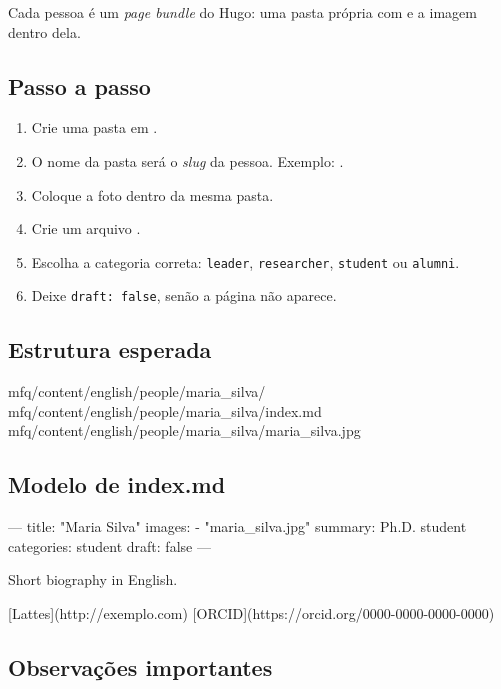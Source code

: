 \documentclass[11pt,a4paper]{article}
\begin{document}
Cada pessoa é um \emph{page bundle} do Hugo: uma pasta própria com  e a imagem dentro dela.

\subsection{Passo a passo}

\begin{enumerate}
  \item Crie uma pasta em .
  \item O nome da pasta será o \emph{slug} da pessoa. Exemplo: .
  \item Coloque a foto dentro da mesma pasta.
  \item Crie um arquivo .
  \item Escolha a categoria correta: \texttt{leader}, \texttt{researcher}, \texttt{student} ou \texttt{alumni}.
  \item Deixe \texttt{draft: false}, senão a página não aparece.
\end{enumerate}

\subsection{Estrutura esperada}

\begin{terminal}
mfq/content/english/people/maria_silva/
mfq/content/english/people/maria_silva/index.md
mfq/content/english/people/maria_silva/maria_silva.jpg
\end{terminal}

\subsection{Modelo de index.md}

\begin{terminal}
---
title: "Maria Silva"
images:
  - "maria_silva.jpg"
summary: Ph.D. student
categories: student
draft: false
---

Short biography in English.

[Lattes](http://exemplo.com)
[ORCID](https://orcid.org/0000-0000-0000-0000)
\end{terminal}

\subsection{Observações importantes}
\end{document}
